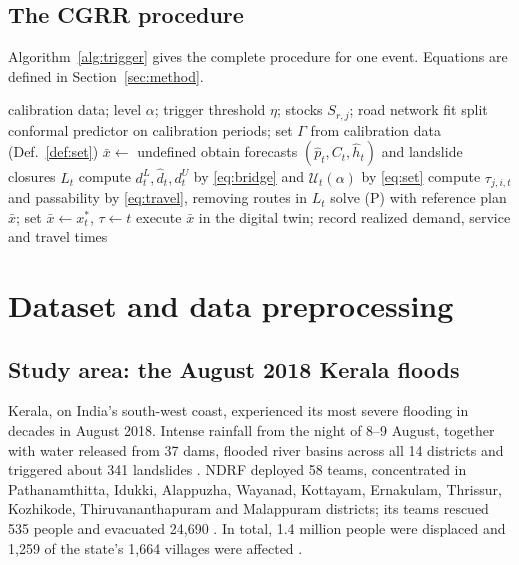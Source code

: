 \documentclass[pdflatex,sn-basic]{sn-jnl}
\theoremstyle{plain}%
\theoremstyle{remark}%
\theoremstyle{definition}%
\begin{document}
\subsection{The CGRR procedure}

Algorithm~\ref{alg:trigger} gives the complete procedure for one event. Equations are defined in Section~\ref{sec:method}.

\begin{algorithm}[h]
\caption{Calibration-guided robust reallocation (CGRR) over one flood event}\label{alg:trigger}
\begin{algorithmic}[1]
\Require calibration data; level $\alpha$; trigger threshold $\eta$; stocks $S_{r,j}$; road network
\State fit split conformal predictor on calibration periods; set $\Gamma$ from calibration data (Def.~\ref{def:set})
\State $\bar x \gets$ undefined
  \State obtain forecasts $(\hat p_t, C_t, \hat h_t)$ and landslide closures $L_t$
  \State compute $d^{L}_t, \hat d_t, d^{U}_t$ by \eqref{eq:bridge} and $\mathcal{U}_t(\alpha)$ by \eqref{eq:set}
  \State compute $\tau_{j,i,t}$ and passability by \eqref{eq:travel}, removing routes in $L_t$
    \State solve (P) with reference plan $\bar x$; set $\bar x \gets x^{\ast}_t$, $\tau \gets t$
  \EndIf
  \State execute $\bar x$ in the digital twin; record realized demand, service and travel times
\EndFor
\end{algorithmic}
\end{algorithm}

\section{Dataset and data preprocessing}\label{sec:data}

\subsection{Study area: the August 2018 Kerala floods}

Kerala, on India's south-west coast, experienced its most severe flooding in decades in August 2018. Intense rainfall from the night of 8--9 August, together with water released from 37 dams, flooded river basins across all 14 districts and triggered about 341 landslides \citep{PDNA2018,NDRF2018}. NDRF deployed 58 teams, concentrated in Pathanamthitta, Idukki, Alappuzha, Wayanad, Kottayam, Ernakulam, Thrissur, Kozhikode, Thiruvananthapuram and Malappuram districts; its teams rescued 535 people and evacuated 24,690 \citep{NDRF2018}. In total, 1.4 million people were displaced and 1,259 of the state's 1,664 villages were affected \citep{PDNA2018}.
\end{document}
